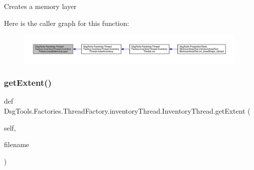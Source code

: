 \begin{DoxyVerb}Creates a memory layer
\end{DoxyVerb}
 Here is the caller graph for this function\+:
\nopagebreak
\begin{figure}[H]
\begin{center}
\leavevmode
\includegraphics[width=350pt]{class_dsg_tools_1_1_factories_1_1_thread_factory_1_1inventory_thread_1_1_inventory_thread_ab791655b05235f3a4f0c57708d057371_icgraph}
\end{center}
\end{figure}
\mbox{\label{class_dsg_tools_1_1_factories_1_1_thread_factory_1_1inventory_thread_1_1_inventory_thread_a9b4252c1a4521ad460bd13842fe02483}} 
\subsubsection{\texorpdfstring{get\+Extent()}{getExtent()}}
{\footnotesize\ttfamily def Dsg\+Tools.\+Factories.\+Thread\+Factory.\+inventory\+Thread.\+Inventory\+Thread.\+get\+Extent (\begin{DoxyParamCaption}\item[{}]{self,  }\item[{}]{filename }\end{DoxyParamCaption})}

